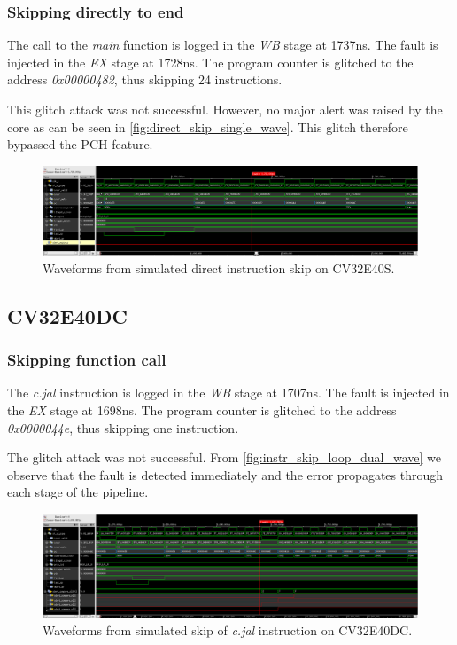 \subsubsection{Skipping directly to end}

The call to the \textit{main} function is logged in the \textit{WB} stage at 1737ns. The fault is injected in the \textit{EX} stage at 1728ns. The program counter is glitched to the address \textit{0x00000482}, thus skipping 24 instructions.

This glitch attack was not successful. However, no major alert was raised by the core as can be seen in \autoref{fig:direct_skip_single_wave}. This glitch therefore bypassed the PCH feature. 

\begin{figure}[h!]
    \centering
    \includegraphics[width=\textwidth]{docs/images/direct_skip_single_core.png}
    \caption{Waveforms from simulated direct instruction skip on CV32E40S.}
    \label{fig:direct_skip_single_wave}
\end{figure}

\subsection{CV32E40DC}
\label{subsec:dual_instr_skip}

\subsubsection{Skipping function call}

The \textit{c.jal} instruction is logged in the \textit{WB} stage at 1707ns. The fault is injected in the \textit{EX} stage at 1698ns. The program counter is glitched to the address \textit{0x0000044e}, thus skipping one instruction. 

The glitch attack was not successful. From \autoref{fig:instr_skip_loop_dual_wave} we observe that the fault is detected immediately and the error propagates through each stage of the pipeline. 

\begin{figure}[h!]
    \centering
    \includegraphics[width=\textwidth]{docs/images/instr_skip_dual_core.png}
    \caption{Waveforms from simulated skip of \textit{c.jal} instruction on CV32E40DC.}
    \label{fig:instr_skip_dual_wave}
\end{figure}


